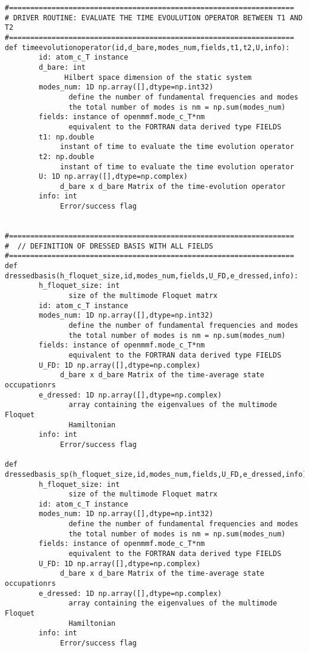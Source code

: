 \documentclass[10pt,a4paper]{article}
\begin{document}
\begin{verbatim}
#===================================================================
# DRIVER ROUTINE: EVALUATE THE TIME EVOULUTION OPERATOR BETWEEN T1 AND T2
#===================================================================
def timeevolutionoperator(id,d_bare,modes_num,fields,t1,t2,U,info):
        id: atom_c_T instance
        d_bare: int
              Hilbert space dimension of the static system
        modes_num: 1D np.array([],dtype=np.int32)
               define the number of fundamental frequencies and modes
               the total number of modes is nm = np.sum(modes_num)
        fields: instance of openmmf.mode_c_T*nm 
               equivalent to the FORTRAN data derived type FIELDS
        t1: np.double
             instant of time to evaluate the time evolution operator
        t2: np.double
             instant of time to evaluate the time evolution operator
        U: 1D np.array([],dtype=np.complex)
             d_bare x d_bare Matrix of the time-evolution operator
        info: int
             Error/success flag


#===================================================================
#  // DEFINITION OF DRESSED BASIS WITH ALL FIELDS
#===================================================================
def dressedbasis(h_floquet_size,id,modes_num,fields,U_FD,e_dressed,info):
        h_floquet_size: int
               size of the multimode Floquet matrx
        id: atom_c_T instance
        modes_num: 1D np.array([],dtype=np.int32)
               define the number of fundamental frequencies and modes
               the total number of modes is nm = np.sum(modes_num)
        fields: instance of openmmf.mode_c_T*nm 
               equivalent to the FORTRAN data derived type FIELDS
        U_FD: 1D np.array([],dtype=np.complex)
             d_bare x d_bare Matrix of the time-average state occupationrs                          
        e_dressed: 1D np.array([],dtype=np.complex)
               array containing the eigenvalues of the multimode Floquet
               Hamiltonian
        info: int
             Error/success flag

def dressedbasis_sp(h_floquet_size,id,modes_num,fields,U_FD,e_dressed,info):
        h_floquet_size: int
               size of the multimode Floquet matrx
        id: atom_c_T instance
        modes_num: 1D np.array([],dtype=np.int32)
               define the number of fundamental frequencies and modes
               the total number of modes is nm = np.sum(modes_num)
        fields: instance of openmmf.mode_c_T*nm 
               equivalent to the FORTRAN data derived type FIELDS
        U_FD: 1D np.array([],dtype=np.complex)
             d_bare x d_bare Matrix of the time-average state occupationrs                          
        e_dressed: 1D np.array([],dtype=np.complex)
               array containing the eigenvalues of the multimode Floquet
               Hamiltonian
        info: int
             Error/success flag



\end{verbatim}
\end{document}
